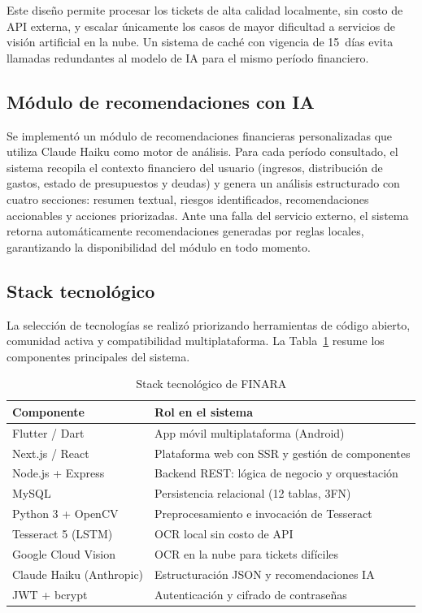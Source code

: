 \documentclass[10pt,twocolumn,letterpaper]{article}
\begin{document}
Este diseño permite procesar los tickets de alta calidad localmente, sin costo de API externa, y
escalar únicamente los casos de mayor dificultad a servicios de visión artificial en la nube. Un
sistema de caché con vigencia de 15~días evita llamadas redundantes al modelo de IA para el mismo
período financiero.

\subsection{Módulo de recomendaciones con IA}

Se implementó un módulo de recomendaciones financieras personalizadas que utiliza Claude Haiku como
motor de análisis. Para cada período consultado, el sistema recopila el contexto financiero del
usuario (ingresos, distribución de gastos, estado de presupuestos y deudas) y genera un análisis
estructurado con cuatro secciones: resumen textual, riesgos identificados, recomendaciones
accionables y acciones priorizadas. Ante una falla del servicio externo, el sistema retorna
automáticamente recomendaciones generadas por reglas locales, garantizando la disponibilidad del
módulo en todo momento.

\subsection{Stack tecnológico}

La selección de tecnologías se realizó priorizando herramientas de código abierto, comunidad
activa y compatibilidad multiplataforma. La Tabla~\ref{tab:stack} resume los componentes
principales del sistema.

\begin{table}[H]
  \centering
  \small
  \caption{Stack tecnológico de FINARA}
  \label{tab:stack}
  \renewcommand{\arraystretch}{1.15}
  \begin{tabular}{p{2.2cm}p{4.4cm}}
    \toprule
    \textbf{Componente}   & \textbf{Rol en el sistema} \\
    \midrule
    Flutter / Dart        & App móvil multiplataforma (Android) \\
    Next.js / React       & Plataforma web con SSR y gestión de componentes \\
    Node.js + Express     & Backend REST: lógica de negocio y orquestación \\
    MySQL                 & Persistencia relacional (12 tablas, 3FN) \\
    Python 3 + OpenCV     & Preprocesamiento e invocación de Tesseract \\
    Tesseract 5 (LSTM)    & OCR local sin costo de API \\
    Google Cloud Vision   & OCR en la nube para tickets difíciles \\
    Claude Haiku (Anthropic) & Estructuración JSON y recomendaciones IA \\
    JWT + bcrypt          & Autenticación y cifrado de contraseñas \\
    \bottomrule
  \end{tabular}
\end{table}
\end{document}
